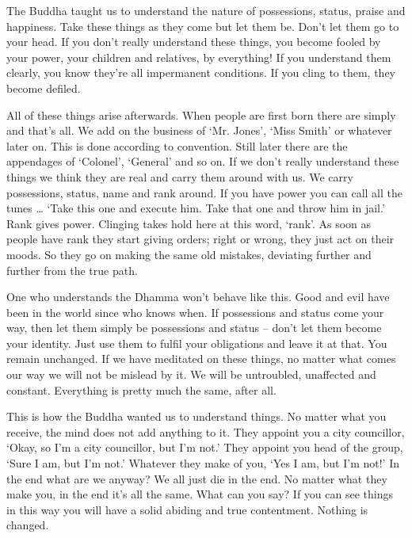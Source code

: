 The Buddha taught us to understand the nature of possessions, status, praise and happiness. Take these things as they come but let them be. Don't let them go to your head. If you don't really understand these things, you become fooled by your power, your children and relatives, by everything! If you understand them clearly, you know they're all impermanent conditions. If you cling to them, they become defiled. 

All of these things arise afterwards. When people are first born there are simply  and  that's all. We add on the business of `Mr. Jones', `Miss Smith' or whatever later on. This is done according to convention. Still later there are the appendages of `Colonel', `General' and so on. If we don't really understand these things we think they are real and carry them around with us. We carry possessions, status, name and rank around. If you have power you can call all the tunes \ldots{} `Take this one and execute him. Take that one and throw him in jail.' Rank gives power. Clinging takes hold here at this word, `rank'. As soon as people have rank they start giving orders; right or wrong, they just act on their moods. So they go on making the same old mistakes, deviating further and further from the true path. 

One who understands the Dhamma won't behave like this. Good and evil have been in the world since who knows when. If possessions and status come your way, then let them simply be possessions and status -- don't let them become your identity. Just use them to fulfil your obligations and leave it at that. You remain unchanged. If we have meditated on these things, no matter what comes our way we will not be mislead by it. We will be untroubled, unaffected and constant. Everything is pretty much the same, after all. 

This is how the Buddha wanted us to understand things. No matter what you receive, the mind does not add anything to it. They appoint you a city councillor, `Okay, so I'm a city councillor, but I'm not.' They appoint you head of the group, `Sure I am, but I'm not.' Whatever they make of you, `Yes I am, but I'm not!' In the end what are we anyway? We all just die in the end. No matter what they make you, in the end it's all the same. What can you say? If you can see things in this way you will have a solid abiding and true contentment. Nothing is changed. 

